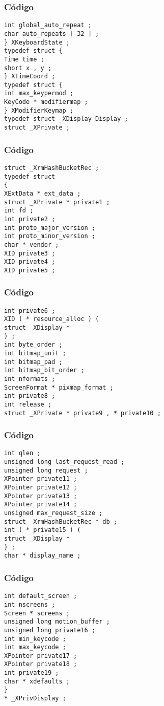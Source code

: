 \documentclass{beamer}
\begin{document}
\begin{frame}[fragile]
\frametitle{C\'odigo}
\begin{verbatim}
int global_auto_repeat ; 
char auto_repeats [ 32 ] ; 
} XKeyboardState ; 
typedef struct { 
Time time ; 
short x , y ; 
} XTimeCoord ; 
typedef struct { 
int max_keypermod ; 
KeyCode * modifiermap ; 
} XModifierKeymap ; 
typedef struct _XDisplay Display ; 
struct _XPrivate ; 
\end{verbatim}
\end{frame}
\begin{frame}[fragile]
\frametitle{C\'odigo}
\begin{verbatim}
struct _XrmHashBucketRec ; 
typedef struct 
{ 
XExtData * ext_data ; 
struct _XPrivate * private1 ; 
int fd ; 
int private2 ; 
int proto_major_version ; 
int proto_minor_version ; 
char * vendor ; 
XID private3 ; 
XID private4 ; 
XID private5 ; 
\end{verbatim}
\end{frame}
\begin{frame}[fragile]
\frametitle{C\'odigo}
\begin{verbatim}
int private6 ; 
XID ( * resource_alloc ) ( 
struct _XDisplay * 
) ; 
int byte_order ; 
int bitmap_unit ; 
int bitmap_pad ; 
int bitmap_bit_order ; 
int nformats ; 
ScreenFormat * pixmap_format ; 
int private8 ; 
int release ; 
struct _XPrivate * private9 , * private10 ; 
\end{verbatim}
\end{frame}
\begin{frame}[fragile]
\frametitle{C\'odigo}
\begin{verbatim}
int qlen ; 
unsigned long last_request_read ; 
unsigned long request ; 
XPointer private11 ; 
XPointer private12 ; 
XPointer private13 ; 
XPointer private14 ; 
unsigned max_request_size ; 
struct _XrmHashBucketRec * db ; 
int ( * private15 ) ( 
struct _XDisplay * 
) ; 
char * display_name ; 
\end{verbatim}
\end{frame}
\begin{frame}[fragile]
\frametitle{C\'odigo}
\begin{verbatim}
int default_screen ; 
int nscreens ; 
Screen * screens ; 
unsigned long motion_buffer ; 
unsigned long private16 ; 
int min_keycode ; 
int max_keycode ; 
XPointer private17 ; 
XPointer private18 ; 
int private19 ; 
char * xdefaults ; 
} 
* _XPrivDisplay ; 
\end{verbatim}
\end{frame}
\end{document}
